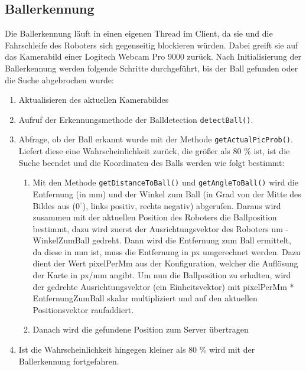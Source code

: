 \subsection{Ballerkennung}

\label{sec:balldetection}
Die Ballerkennung läuft in einen eigenen Thread im Client, da sie und
die Fahrschleife des Roboters sich gegenseitig blockieren
würden. Dabei greift sie auf das Kamerabild einer Logitech Webcam Pro 9000
zurück. Nach Initialisierung der Ballerkennung
werden folgende Schritte durchgeführt, bis der Ball gefunden oder die
Suche abgebrochen wurde:
\begin{enumerate}
\item Aktualisieren des aktuellen Kamerabildes
\item Aufruf der Erkennungsmethode der Balldetection
  \lstinline|detectBall()|. 
\item Abfrage, ob der Ball erkannt wurde mit der Methode
  \lstinline|getActualPicProb()|. Liefert diese eine
  Wahrscheinlichkeit zurück, die größer als 80 \% ist, ist die Suche
  beendet und die Koordinaten des Balls werden wie folgt bestimmt:
  \begin{enumerate}
  \item Mit den Methode \lstinline|getDistanceToBall()| und
    \lstinline|getAngleToBall()| wird die Entfernung (in mm) und der Winkel
    zum Ball (in Grad von der Mitte des Bildes aus ($0^\circ$), links positiv, rechts
		negativ) abgerufen. Daraus wird zusammen mit der aktuellen Position des Roboters
    die Ballposition bestimmt, dazu wird zuerst der Ausrichtungsvektor des
		Roboters um -WinkelZumBall gedreht. Dann wird die Entfernung zum Ball
		ermittelt, da diese in mm ist, muss die Entfernung in px umgerechnet
		werden. Dazu dient der Wert pixelPerMm aus der Konfiguration, welcher
		die Auflösung der Karte in px/mm angibt. Um nun die Ballposition zu
		erhalten, wird der gedrehte Ausrichtungsvektor (ein Einheitsvektor) mit
		pixelPerMm * EntfernungZumBall skalar multipliziert und auf den aktuellen
		Positionsvektor raufaddiert.
  \item Danach wird die gefundene Position zum Server übertragen
  \end{enumerate}
\item Ist die Wahrscheinlichkeit hingegen kleiner als 80 \% wird mit
  der Ballerkennung fortgefahren. 
\end{enumerate}

